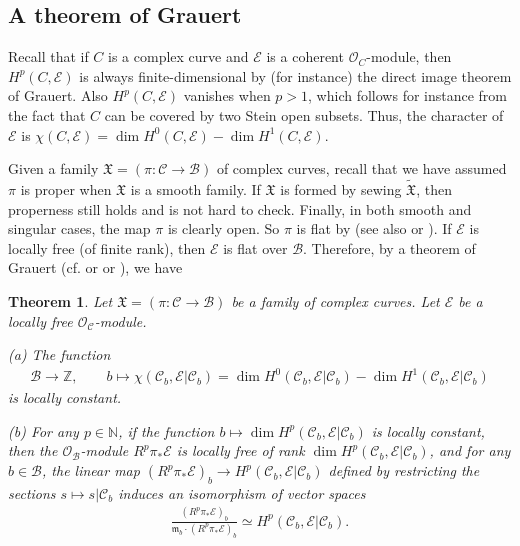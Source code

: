 \documentclass[11pt,b5paper,notitlepage]{article}
\theoremstyle{definition}
\theoremstyle{plain}
\newtheorem{thm}[df]{Theorem}
\newcommand{\fk}{\mathfrak}
\newcommand{\mc}{\mathcal}
\newcommand{\wtd}{\widetilde}
\newcommand{\scr}{\mathscr}
\numberwithin{equation}{section}
\begin{document}
\subsection*{A theorem of Grauert}

Recall that if $C$ is a complex curve and $\scr E$ is a coherent $\scr O_C$-module, then  $H^p(C,\scr E)$ is always finite-dimensional by (for instance) the direct image theorem of Grauert. Also $H^p(C,\scr E)$ vanishes when $p>1$, which follows for instance from the fact that $C$ can be covered by two Stein open subsets. Thus, the character of $\scr E$ is $\chi(C,\scr E)=\dim H^0(C,\scr E)-\dim H^1(C,\scr E)$.


Given a family $\fk X=(\pi:\mc C\rightarrow\mc B)$ of complex curves, recall that we have assumed $\pi$ is proper when $\fk X$ is a smooth family. If $\fk X$ is formed by sewing $\wtd{\fk X}$, then properness still holds and is not hard to check. Finally, in both smooth and singular cases, the map $\pi$ is clearly open. So $\pi$ is flat by  \cite[Sec. 3.20]{Fis76} (see also \cite[Thm. II.2.13]{GPR94} or \cite[Thm. V.2.13]{BS76}). If $\scr E$ is locally free (of finite rank), then $\scr E$ is flat over $\mc B$. Therefore, by a theorem of Grauert \cite{Gra60} (cf. \cite[Thm. III.4.7]{GPR94} or \cite[Thm. III.4.12]{BS76} or \cite[Thm. 9.4.8]{EP96}), we have

\begin{thm}\label{lb11}
Let $\fk X=(\pi:\mc C\rightarrow\mc B)$ be a family of complex curves. Let $\scr E$ be a locally free $\scr O_{\mc C}$-module.

(a) The function
\begin{gather*}
\mc B\rightarrow \mathbb Z, \qquad b\mapsto\chi(\mc C_b,\scr E|\mc C_b)=\dim H^0(\mc C_b,\scr E|\mc C_b)-\dim H^1(\mc C_b,\scr E|\mc C_b)
\end{gather*}
is locally constant. 

(b) For any $p\in\mathbb N$, if the function  $b\mapsto\dim H^p(\mc C_b,\scr E|\mc C_b)$ is  locally constant, then the $\scr O_{\mc B}$-module $R^p\pi_*\scr E$ is  locally free of rank $\dim H^p(\mc C_b,\scr E|\mc C_b)$, and for any $b\in\mc B$, the linear map $(R^p\pi_*\scr E)_b\rightarrow H^p(\mc C_b,\scr E|\mc C_b)$ defined by  restricting the sections $s\mapsto s|{\mc C_b}$ induces an isomorphism of vector spaces
\begin{align*}
\frac{(R^p\pi_*\scr E)_b}{\fk m_b\cdot (R^p\pi_*\scr E)_b}\simeq H^p(\mc C_b,\scr E|\mc C_b).
\end{align*}
\end{thm}
\end{document}
